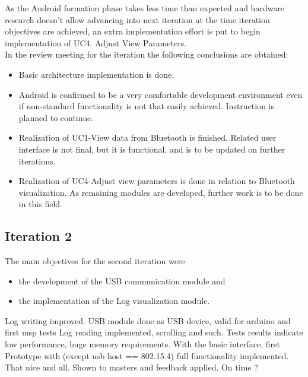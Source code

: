 			As the Android formation phase takes less time than expected and hardware research doesn't allow advancing into next iteration at the time iteration objectives are achieved, an extra implementation effort is put to begin implementation of UC4. Adjust View Parameters.\\

			In the review meeting for the iteration the following conclusions are obtained:
			\begin{itemize}
				\item Basic architecture implementation is done.
				\item Android is confirmed to be a very comfortable development environment even if non-standard functionality is not that easily achieved. Instruction is planned to continue.
				\item Realization of UC1-View data from Bluetooth is finished. Related user interface is not final, but it is functional, and is to be updated on further iterations.
				\item Realization of UC4-Adjust view parameters is done in relation to Bluetooth visualization. As remaining modules are developed, further work is to be done in this field.
			\end{itemize}

			
		\subsection{Iteration 2}

			The main objectives for the second iteration were
			\begin{itemize} 
				\item the development of the USB communication module and
				\item the implementation of the Log visualization module.
			\end{itemize}

			Log writing improved.
			USB module done as USB device, valid for arduino and first msp tests
			Log reading implemented, scrolling and such. Tests results indicate low performance, huge memory requirements.
			With the basic interface, first Prototype with (except usb host == 802.15.4) full functionality implemented. That nice and all. Shown to masters and feedback applied.
			On time ?

